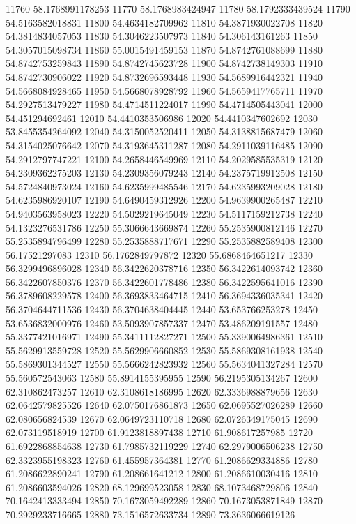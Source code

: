 {11760 58.1768991178253
11770 58.1768983424947
11780 58.1792333439524
11790 54.5163582018831
11800 54.4634182709962
11810 54.3871930022708
11820 54.3814834057053
11830 54.3046223507973
11840 54.306143161263
11850 54.3057015098734
11860 55.0015491459153
11870 54.8742761088699
11880 54.8742753259843
11890 54.8742745623728
11900 54.8742738149303
11910 54.8742730906022
11920 54.8732696593448
11930 54.5689916442321
11940 54.5668084928465
11950 54.5668078928792
11960 54.5659417765711
11970 54.2927513479227
11980 54.4714511224017
11990 54.4714505443041
12000 54.451294692461
12010 54.4410353506986
12020 54.4410347602692
12030 53.8455354264092
12040 54.3150052520411
12050 54.3138815687479
12060 54.3154025076642
12070 54.3193645311287
12080 54.2911039116485
12090 54.2912797747221
12100 54.2658446549969
12110 54.2029585535319
12120 54.2309362275203
12130 54.2309356079243
12140 54.2375719912508
12150 54.5724840973024
12160 54.6235999485546
12170 54.6235993209028
12180 54.6235986920107
12190 54.6490459312926
12200 54.9639900265487
12210 54.9403563958023
12220 54.5029219645049
12230 54.5117159212738
12240 54.1323276531786
12250 55.3066643669874
12260 55.2535900812146
12270 55.2535894796499
12280 55.2535888717671
12290 55.2535882589408
12300 56.17521297083
12310 56.1762849797872
12320 55.6868464651217
12330 56.3299496896028
12340 56.3422620378716
12350 56.3422614093742
12360 56.3422607850376
12370 56.3422601778486
12380 56.3422595641016
12390 56.3789608229578
12400 56.3693833464715
12410 56.3694336035341
12420 56.3704644711536
12430 56.3704638404445
12440 53.653766253278
12450 53.6536832000976
12460 53.5093907857337
12470 53.486209191557
12480 55.3377421016971
12490 55.3411112827271
12500 55.3390064986361
12510 55.5629913559728
12520 55.5629906660852
12530 55.5869308161938
12540 55.5869301344527
12550 55.5666242823932
12560 55.5634041327284
12570 55.560572543063
12580 55.8914155395955
12590 56.2195305134267
12600 62.310862473257
12610 62.3108618186995
12620 62.3336988879656
12630 62.0642579825526
12640 62.0750176861873
12650 62.0695527026289
12660 62.080656824539
12670 62.0649723110718
12680 62.0726349175045
12690 62.073119518919
12700 61.9123818897438
12710 61.908617257985
12720 61.6922868854638
12730 61.7985732119229
12740 62.2979006506238
12750 62.3323955198323
12760 61.455957364381
12770 61.2086629334886
12780 61.2086622890241
12790 61.208661641212
12800 61.2086610030416
12810 61.2086603594026
12820 68.129699523058
12830 68.1073468729806
12840 70.1642413333494
12850 70.1673059492289
12860 70.1673053871849
12870 70.2929233716665
12880 73.1516572633734
12890 73.3636066619126
}
